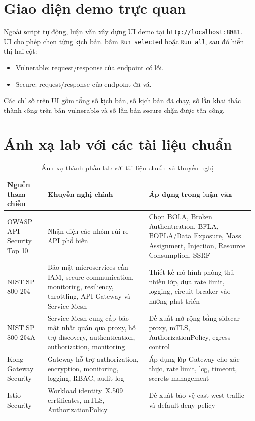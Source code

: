 \documentclass[14pt,a4paper]{extreport}
\begin{document}
\section{Giao diện demo trực quan}
Ngoài script tự động, luận văn xây dựng UI demo tại \texttt{http://localhost:8081}. UI cho phép chọn từng kịch bản, bấm \texttt{Run selected} hoặc \texttt{Run all}, sau đó hiển thị hai cột:
\begin{itemize}
  \item Vulnerable: request/response của endpoint có lỗi.
  \item Secure: request/response của endpoint đã vá.
\end{itemize}

Các chỉ số trên UI gồm tổng số kịch bản, số kịch bản đã chạy, số lần khai thác thành công trên bản vulnerable và số lần bản secure chặn được tấn công.

\section{Ánh xạ lab với các tài liệu chuẩn}
\begin{longtable}{p{3.8cm}p{5.2cm}p{5cm}}
\caption{Ánh xạ thành phần lab với tài liệu chuẩn và khuyến nghị}\\
\toprule
\textbf{Nguồn tham chiếu} & \textbf{Khuyến nghị chính} & \textbf{Áp dụng trong luận văn}\\
\midrule
OWASP API Security Top 10 & Nhận diện các nhóm rủi ro API phổ biến & Chọn BOLA, Broken Authentication, BFLA, BOPLA/Data Exposure, Mass Assignment, Injection, Resource Consumption, SSRF\\
NIST SP 800-204 & Bảo mật microservices cần IAM, secure communication, monitoring, resiliency, throttling, API Gateway và Service Mesh & Thiết kế mô hình phòng thủ nhiều lớp, đưa rate limit, logging, circuit breaker vào hướng phát triển\\
NIST SP 800-204A & Service Mesh cung cấp bảo mật nhất quán qua proxy, hỗ trợ discovery, authentication, authorization, monitoring & Đề xuất mở rộng bằng sidecar proxy, mTLS, AuthorizationPolicy, egress control\\
Kong Gateway Security & Gateway hỗ trợ authorization, encryption, monitoring, logging, RBAC, audit log & Áp dụng lớp Gateway cho xác thực, rate limit, log, timeout, secrets management\\
Istio Security & Workload identity, X.509 certificates, mTLS, AuthorizationPolicy & Đề xuất bảo vệ east-west traffic và default-deny policy\\
\bottomrule
\end{longtable}
\end{document}
